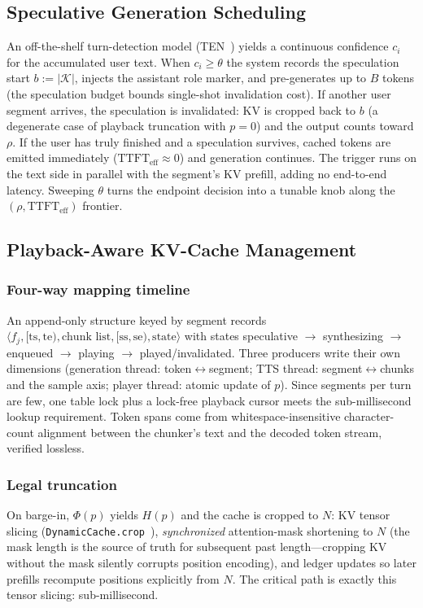 \documentclass[conference]{IEEEtran}
\begin{document}
\subsection{Speculative Generation Scheduling}\label{sec:spec}
An off-the-shelf turn-detection model (TEN~\cite{ten_turn}) yields a continuous confidence $c_i$ for the accumulated user text. When $c_i\ge\theta$ the system records the speculation start $b:=|\mathcal{K}|$, injects the assistant role marker, and pre-generates up to $B$ tokens (the speculation budget bounds single-shot invalidation cost). If another user segment arrives, the speculation is invalidated: KV is cropped back to $b$ (a degenerate case of playback truncation with $p=0$) and the output counts toward $\rho$. If the user has truly finished and a speculation survives, cached tokens are emitted immediately ($\mathrm{TTFT}_{\mathrm{eff}}\approx0$) and generation continues. The trigger runs on the text side in parallel with the segment's KV prefill, adding no end-to-end latency. Sweeping $\theta$ turns the endpoint decision into a tunable knob along the $(\rho,\mathrm{TTFT}_{\mathrm{eff}})$ frontier.

\subsection{Playback-Aware KV-Cache Management}\label{sec:kv}
\subsubsection{Four-way mapping timeline} An append-only structure keyed by segment records $\langle f_j, [\mathrm{ts},\mathrm{te}), \text{chunk list}, [\mathrm{ss},\mathrm{se}), \text{state}\rangle$ with states speculative $\rightarrow$ synthesizing $\rightarrow$ enqueued $\rightarrow$ playing $\rightarrow$ played/invalidated. Three producers write their own dimensions (generation thread: token$\leftrightarrow$segment; TTS thread: segment$\leftrightarrow$chunks and the sample axis; player thread: atomic update of $p$). Since segments per turn are few, one table lock plus a lock-free playback cursor meets the sub-millisecond lookup requirement. Token spans come from whitespace-insensitive character-count alignment between the chunker's text and the decoded token stream, verified lossless.

\subsubsection{Legal truncation} On barge-in, $\Phi(p)$ yields $H(p)$ and the cache is cropped to $N$: KV tensor slicing (\texttt{DynamicCache.crop}~\cite{hf_kvcache}), \emph{synchronized} attention-mask shortening to $N$ (the mask length is the source of truth for subsequent past length---cropping KV without the mask silently corrupts position encoding), and ledger updates so later prefills recompute positions explicitly from $N$. The critical path is exactly this tensor slicing: sub-millisecond.
\end{document}
